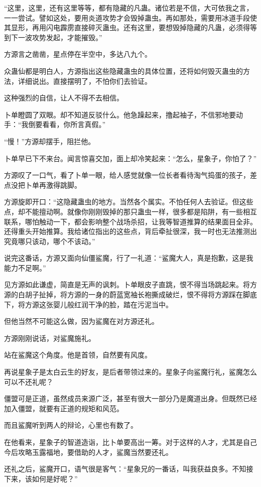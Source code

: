 \begin{this_body}
“这里，这里，还有这里等等，都有隐藏的凡蛊。诸位若是不信，大可依我之言，一一尝试。譬如这处，要用炎道攻势才会毁掉蛊虫。再如那处，需要用冰道手段使其显形，再用闪电霹雳直接碎灭蛊虫。还有这里，要想毁掉隐藏的凡蛊，必须得等到下一波攻势发起，才能摧毁。”

方源言之凿凿，星点停在半空中，多达八九个。

众蛊仙都是明白人，方源指出这些隐藏蛊虫的具体位置，还将如何毁灭蛊虫的方法，详细说出。直接摆明了，不怕你们去验证。

这种强烈的自信，让人不得不去相信。

卜单瞪圆了双眼。却不知道反驳什么。他急躁起来，撸起袖子，不信邪地要动手：“我倒要看看，你所言真假。”

“慢！”方源却摆手，阻拦他。

卜单早已下不来台。闻言惊喜交加，面上却冷笑起来：“怎么，星象子，你怕了？”

方源叹了一口气，看了卜单一眼，给人感觉就像一位长者看待淘气捣蛋的孩子，差点没把卜单再激得跳脚。

方源旋即开口：“这隐藏蛊虫的地方。当然各个属实。不怕任何人去验证。但这些点，却不能擅动啊。就像你刚刚毁掉的那只蛊虫一样，很多都是陷阱，有一些相互联系，哪怕触动一下，都会影响整个战场杀招，让我等智道推算的结果面目全非。还得重头开始推算。我给诸位指出的这些点，背后牵扯很深，我一时也无法推测出究竟哪只该动，哪个不该动。”

说完这番话，方源又面向仙僵鲨魔，行了一礼道：“鲨魔大人，真是抱歉，这是我能力不足啊。”

见方源如此谦虚，简直是无声的讽刺。卜单眼皮子直跳，恨不得当场跳起来。将方源的白胡子扯掉，将方源的一身的蔚蓝宽袖长袍撕成破烂，恨不得将方源踩在脚底下，将方源这张婴儿般红润干净的脸，踏在污泥当中。

但他当然不可能这么做，因为鲨魔在对方源还礼。

方源刚刚说话，对鲨魔施礼。

站在鲨魔这个角度。他是首领，自然要有风度。

再说星象子是太白云生的好友，是后者带领过来的。星象子向鲨魔行礼，鲨魔怎么可以不还礼呢？

僵盟可是正道，虽然成员来源广泛，甚至有很大一部分乃是魔道出身。但既然已经加入僵盟，就要有正道的规矩和风范。

而且鲨魔听到两人的辩论，心里也有数了。

在他看来，星象子的智道造诣，比卜单要高出一筹。对于这样的人才，尤其是自己今后攻略玉露福地，要借助的人才，鲨魔当然要还礼。

还礼之后，鲨魔开口，语气很是客气：“星象兄的一番话，叫我获益良多。不知接下来，该如何是好呢？”


\end{this_body}
